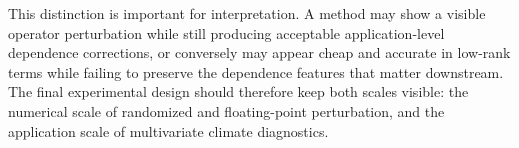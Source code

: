 This distinction is important for interpretation. A method may show a visible
operator perturbation while still producing acceptable application-level dependence
corrections, or conversely may appear cheap and accurate in low-rank terms while
failing to preserve the dependence features that matter downstream. The final
experimental design should therefore keep both scales visible: the numerical scale
of randomized and floating-point perturbation, and the application scale of
multivariate climate diagnostics.
